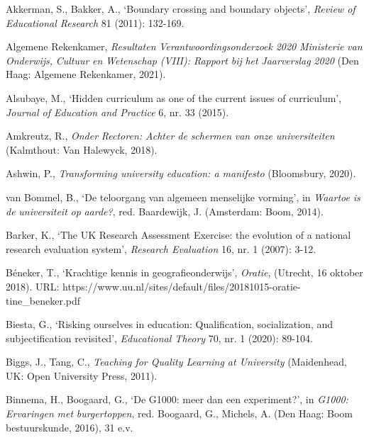 \documentclass[smallauthor, chapterhaspagenum, nochapterinheader, pagenuminheader,  bigchapnum,medium2, tocpages, garamond, titleinheader]{jote-book}
\begin{document}
	\begin{references}


		Akkerman, S., Bakker, A., ‘Boundary crossing and boundary objects', \emph{Review of Educational Research} 81 (2011): 132-169.

		Algemene Rekenkamer, \emph{Resultaten}\emph{ }\emph{Verantwoordingsonderzoek}\emph{ 2020 }\emph{Ministerie}\emph{ van }\emph{Onderwijs}\emph{, }\emph{Cultuur}\emph{ }\emph{en}\emph{ }\emph{Wetenschap}\emph{ (VIII): Rapport }\emph{bij}\emph{ het }\emph{Jaarverslag}\emph{ 2020} (Den Haag: Algemene Rekenkamer, 2021).



		Alsubaye, M., ‘Hidden curriculum as one of the current issues of curriculum', \emph{Journal of Education and Practice} 6, nr. 33 (2015).



		Amkreutz, R., \emph{Onder}\emph{ }\emph{Rectoren}\emph{: Achter de }\emph{schermen}\emph{ van }\emph{onze}\emph{ }\emph{universiteiten} (Kalmthout: Van Halewyck, 2018).



		Ashwin, P., \emph{Transforming university education: a manifesto} (Bloomsbury, 2020).



		van Bommel, B., ‘De teloorgang van algemeen menselijke vorming', in \emph{Waartoe}\emph{ is de }\emph{universiteit}\emph{ op }\emph{aarde}\emph{?}, red. Baardewijk, J. (Amsterdam: Boom, 2014).



		Barker, K., ‘The UK Research Assessment Exercise: the evolution of a national research evaluation system', \emph{Research Evaluation} 16, nr. 1 (2007): 3-12.



		Béneker, T., ‘Krachtige kennis in geografieonderwijs', \emph{Oratie}, (Utrecht, 16 oktober 2018). URL: https://www.uu.nl/sites/default/files/20181015-oratie-tine\_beneker.pdf



		Biesta, G., ‘Risking ourselves in education: Qualification, socialization, and subjectification revisited', \emph{Educational Theory} 70, nr. 1 (2020): 89-104.



		Biggs, J., Tang, C., \emph{Teaching for Quality Learning at University} (Maidenhead, UK: Open University Press, 2011).



		Binnema, H., Boogaard, G., ‘De G1000: meer dan een experiment?', in \emph{G1000: }\emph{Ervaringen}\emph{ met }\emph{burgertoppen}, red. Boogaard, G., Michels, A. (Den Haag: Boom bestuurskunde, 2016), 31 e.v.




\end{references}
\end{document}
